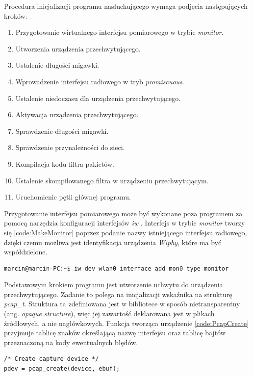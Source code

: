 Procedura inicjalizacji programu nasłuchującego wymaga podjęcia następujących kroków:
\begin{enumerate}
\item Przygotowanie wirtualnego interfejsu pomiarowego w trybie \emph{monitor}.
\item Utworzenia urządzenia przechwytującego.
\item Ustalenie długości migawki.
\item Wprowadzenie interfejsu radiowego w tryb \emph{promiscuous}.
\item Ustalenie niedoczasu dla urządzenia przechwytującego.
\item Aktywacja urządzenia przechwytującego.
\item Sprawdzenie długości migawki.
\item Sprawdzenie przynależności do sieci.
\item Kompilacja kodu filtra pakietów.
\item Ustalenie skompilowanego filtra w urządzeniu przechwytującym.
\item Uruchomienie pętli głównej programu.
\end{enumerate}

Przygotowanie interfejsu pomiarowego może być wykonane poza programem za pomocą narzędzia konfiguracji interfejsów \emph{iw} \cite{www:IW}. Interfejs w trybie \emph{monitor} tworzy się \ref{code:MakeMonitor} poprzez podanie nazwy istniejącego interfejsu radiowego, dzięki czemu możliwa jest identyfikacja urządzenia \emph{Wiphy}, które ma być współdzielone. 

\begin{lstlisting}[frame=tb]
marcin@marcin-PC:~$ iw dev wlan0 interface add mon0 type monitor
\end{lstlisting}

Podstawowym krokiem programu jest utworzenie uchwytu do urządzenia przechwytującego. Zadanie to polega na inicjalizacji wskaźnika na strukturę \emph{pcap\_t}. Struktura ta zdefiniowana jest w bibliotece w sposób nietransparentny (ang. \emph{opaque structure}), więc jej zawartość deklarowana jest w plikach źródłowych, a nie nagłówkowych. Funkcja tworząca urządzenie \ref{code:PcapCreate} przyjmuje tablicę znaków określającą nazwę interfejsu oraz tablicę bajtów przeznaczoną na kody ewentualnych błędów. 

\begin{lstlisting}[frame=tb]
/* Create capture device */
pdev = pcap_create(device, ebuf);
\end{lstlisting}

